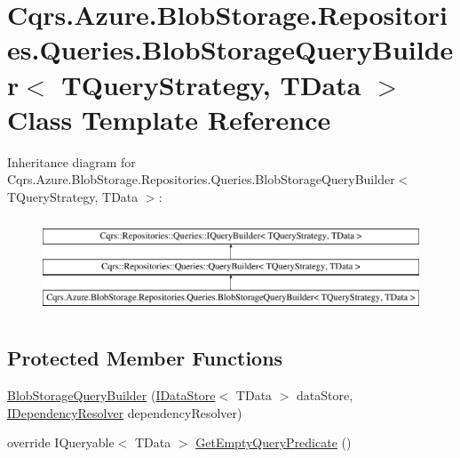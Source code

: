 \hypertarget{classCqrs_1_1Azure_1_1BlobStorage_1_1Repositories_1_1Queries_1_1BlobStorageQueryBuilder}{}\section{Cqrs.\+Azure.\+Blob\+Storage.\+Repositories.\+Queries.\+Blob\+Storage\+Query\+Builder$<$ T\+Query\+Strategy, T\+Data $>$ Class Template Reference}
\label{classCqrs_1_1Azure_1_1BlobStorage_1_1Repositories_1_1Queries_1_1BlobStorageQueryBuilder}
Inheritance diagram for Cqrs.\+Azure.\+Blob\+Storage.\+Repositories.\+Queries.\+Blob\+Storage\+Query\+Builder$<$ T\+Query\+Strategy, T\+Data $>$\+:\begin{figure}[H]
\begin{center}
\leavevmode
\includegraphics[height=2.876712cm]{classCqrs_1_1Azure_1_1BlobStorage_1_1Repositories_1_1Queries_1_1BlobStorageQueryBuilder}
\end{center}
\end{figure}
\subsection*{Protected Member Functions}
\begin{DoxyCompactItemize}
\item 
\hyperlink{classCqrs_1_1Azure_1_1BlobStorage_1_1Repositories_1_1Queries_1_1BlobStorageQueryBuilder_ae6519f289d2b7be9d322dfa7171dea8b_ae6519f289d2b7be9d322dfa7171dea8b}{Blob\+Storage\+Query\+Builder} (\hyperlink{interfaceCqrs_1_1DataStores_1_1IDataStore}{I\+Data\+Store}$<$ T\+Data $>$ data\+Store, \hyperlink{interfaceCqrs_1_1Configuration_1_1IDependencyResolver}{I\+Dependency\+Resolver} dependency\+Resolver)
\item 
override I\+Queryable$<$ T\+Data $>$ \hyperlink{classCqrs_1_1Azure_1_1BlobStorage_1_1Repositories_1_1Queries_1_1BlobStorageQueryBuilder_a5987844de032c5473714dafcee7f4ae1_a5987844de032c5473714dafcee7f4ae1}{Get\+Empty\+Query\+Predicate} ()
\end{DoxyCompactItemize}
